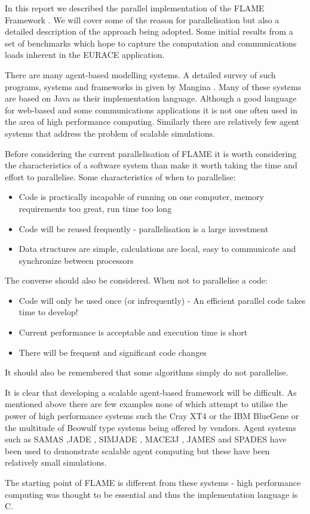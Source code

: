 In this report we described the parallel implementation of the FLAME Framework \cite{Coakley}. We will cover some of the reason for parallelisation but also a detailed description of the approach being adopted. Some initial results from a set of benchmarks which hope to capture the computation and communications loads inherent in the EURACE application.

There are many agent-based modelling systems. A detailed survey of such programs, systems and frameworks in given by Mangina \cite{Mangina}. Many of these systems are based on Java as their implementation language. Although a good language for web-based and some communications applications it is not one often used in the area of high performance computing. Similarly there are relatively few agent systems that address the problem of scalable simulations.

Before considering the current parallelisation of FLAME it is worth considering the characteristics of a software system than make it worth taking the time and effort to parallelise. Some characteristics of when to parallelise:
\begin{itemize}
\item Code is practically incapable of running on one computer, memory requirements too great, run time too long
\item Code will be reused frequently - parallelisation is a large investment
\item Data structures are simple, calculations are local, easy to communicate and synchronize between processors
\end{itemize}
The converse should also be considered. When not to parallelise a code:
\begin{itemize}
\item Code will only be used once (or infrequently) - An efficient parallel code takes time to develop!
\item Current performance is acceptable and execution time is short
\item There will be frequent and significant code changes
\end{itemize}
It should also be remembered that some algorithms simply do not parallelise.

It is clear that developing a scalable agent-based framework will be difficult. As mentioned above there are few examples none of which attempt to utilise the power of high performance systems such the Cray XT4 or the IBM BlueGene or the multitude of Beowulf type systems being offered by vendors. Agent systems such as SAMAS \cite{SAMAS},JADE \cite {JADE}, SIMJADE \cite{SIMJADE}, MACE3J \cite{MACE3J}, JAMES \cite{JAMES} and SPADES \cite{SLADES} have been used to demonstrate scalable agent computing but these have been relatively small simulations.

The starting point of FLAME is different from these systems - high performance computing was thought to be essential and thus the implementation language is C.